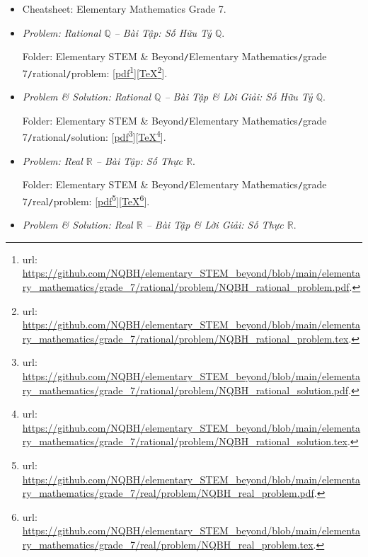 \documentclass[12pt]{article}
\begin{document}
\begin{itemize}
	\item Cheatsheet: Elementary Mathematics Grade 7.
	\item {\it Problem: Rational $\mathbb{Q}$ -- Bài Tập: Số Hữu Tỷ $\mathbb{Q}$}.
	
	Folder: {\sf Elementary STEM \& Beyond{\tt/}Elementary Mathematics{\tt/}grade 7{\tt/}rational{\tt/}problem}: [\href{https://github.com/NQBH/elementary_STEM_beyond/blob/main/elementary_mathematics/grade_7/rational/problem/NQBH_rational_problem.pdf}{pdf}\footnote{{\sc url}: \url{https://github.com/NQBH/elementary_STEM_beyond/blob/main/elementary_mathematics/grade_7/rational/problem/NQBH_rational_problem.pdf}.}][\href{https://github.com/NQBH/elementary_STEM_beyond/blob/main/elementary_mathematics/grade_7/rational/problem/NQBH_rational_problem.tex}{\TeX}\footnote{{\sc url}: \url{https://github.com/NQBH/elementary_STEM_beyond/blob/main/elementary_mathematics/grade_7/rational/problem/NQBH_rational_problem.tex}.}].
	\item {\it Problem \& Solution: Rational $\mathbb{Q}$ -- Bài Tập \& Lời Giải: Số Hữu Tỷ $\mathbb{Q}$}.
	
	Folder: {\sf Elementary STEM \& Beyond{\tt/}Elementary Mathematics{\tt/}grade 7{\tt/}rational{\tt/}solution}: [\href{https://github.com/NQBH/elementary_STEM_beyond/blob/main/elementary_mathematics/grade_7/rational/problem/NQBH_rational_solution.pdf}{pdf}\footnote{{\sc url}: \url{https://github.com/NQBH/elementary_STEM_beyond/blob/main/elementary_mathematics/grade_7/rational/problem/NQBH_rational_solution.pdf}.}][\href{https://github.com/NQBH/elementary_STEM_beyond/blob/main/elementary_mathematics/grade_7/rational/problem/NQBH_rational_solution.tex}{\TeX}\footnote{{\sc url}: \url{https://github.com/NQBH/elementary_STEM_beyond/blob/main/elementary_mathematics/grade_7/rational/problem/NQBH_rational_solution.tex}.}].
	\item {\it Problem: Real $\mathbb{R}$ -- Bài Tập: Số Thực $\mathbb{R}$}.
	
	Folder: {\sf Elementary STEM \& Beyond{\tt/}Elementary Mathematics{\tt/}grade 7{\tt/}real{\tt/}problem}: [\href{https://github.com/NQBH/elementary_STEM_beyond/blob/main/elementary_mathematics/grade_7/real/problem/NQBH_real_problem.pdf}{pdf}\footnote{{\sc url}: \url{https://github.com/NQBH/elementary_STEM_beyond/blob/main/elementary_mathematics/grade_7/real/problem/NQBH_real_problem.pdf}.}][\href{https://github.com/NQBH/elementary_STEM_beyond/blob/main/elementary_mathematics/grade_7/real/problem/NQBH_real_problem.tex}{\TeX}\footnote{{\sc url}: \url{https://github.com/NQBH/elementary_STEM_beyond/blob/main/elementary_mathematics/grade_7/real/problem/NQBH_real_problem.tex}.}].
	\item {\it Problem \& Solution: Real $\mathbb{R}$ -- Bài Tập \& Lời Giải: Số Thực $\mathbb{R}$}.
	

\end{itemize}
\end{document}
